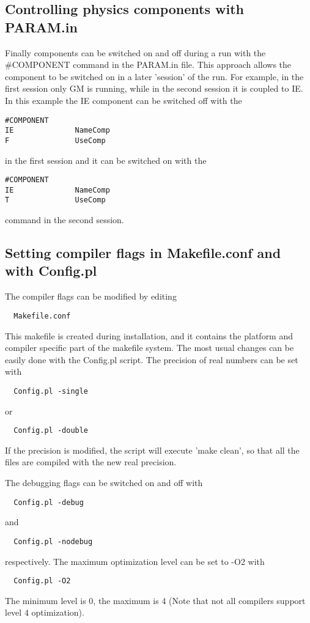 \subsection{Controlling physics components with PARAM.in}

Finally components can be switched on and off during a run
with the \#COMPONENT command in the PARAM.in file. 
This approach allows the component to be switched on in a later 
'session' of the run. For example, in the first session only GM 
is running, while in the second session it is coupled to IE. 
In this example the IE component can be switched off with the
\begin{verbatim}
#COMPONENT
IE              NameComp
F               UseComp
\end{verbatim}
in the first session and it can be switched on with the
\begin{verbatim}
#COMPONENT
IE              NameComp
T               UseComp
\end{verbatim}
command in the second session.



\subsection{Setting compiler flags in Makefile.conf and with Config.pl}

The compiler flags can be modified by editing
\begin{verbatim}
  Makefile.conf
\end{verbatim}
This makefile is created during installation, and it contains the
platform and compiler specific part of the makefile system.
The most usual changes can be easily done with the Config.pl script.
The precision of real numbers can be set with
\begin{verbatim}
  Config.pl -single
\end{verbatim}
or 
\begin{verbatim}
  Config.pl -double
\end{verbatim}
If the precision is modified, the script will execute 'make clean',
so that all the files are compiled with the new real precision.

The debugging flags can be switched on and off with
\begin{verbatim}
  Config.pl -debug
\end{verbatim}
and
\begin{verbatim}
  Config.pl -nodebug
\end{verbatim}
respectively. The maximum optimization level can be set to -O2 with
\begin{verbatim}
  Config.pl -O2
\end{verbatim}
The minimum level is 0, the maximum is 4 (Note that not all compilers support
level 4 optimization).


